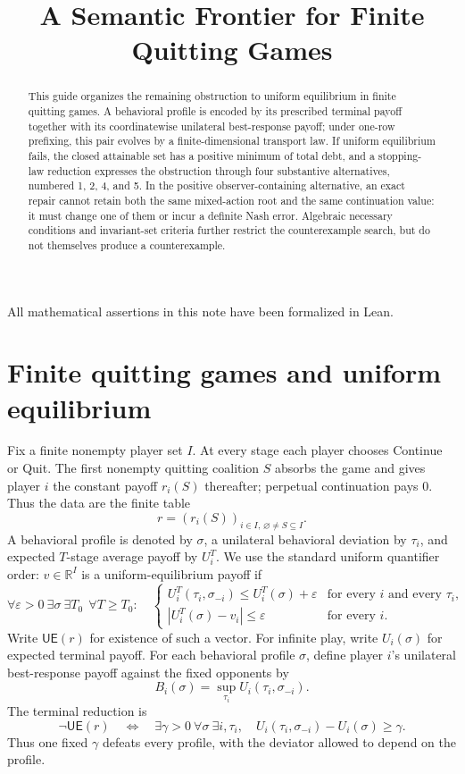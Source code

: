 \documentclass[11pt]{article}
\title{\vspace{-1.2cm}\textbf{A Semantic Frontier for Finite Quitting Games}}
\author{}
\date{}
\newcommand{\R}{\mathbb R}
\newcommand{\UE}{\mathsf{UE}}
\begin{document}
\maketitle

\begin{abstract}
This guide organizes the remaining obstruction to uniform equilibrium in
finite quitting games.  A behavioral profile is encoded by its prescribed
terminal payoff together with its coordinatewise unilateral best-response
payoff; under one-row prefixing, this pair evolves by a finite-dimensional
transport law.  If uniform equilibrium fails, the closed attainable set has
a positive minimum of total debt, and a stopping-law reduction expresses the
obstruction through four substantive alternatives, numbered 1, 2, 4, and 5.
In the positive observer-containing alternative, an exact repair cannot retain both the same mixed-action root
and the same continuation value: it must change one of them or incur a
definite Nash error.  Algebraic necessary conditions and invariant-set
criteria further restrict the counterexample search, but do not themselves
produce a counterexample.
\end{abstract}

All mathematical assertions in this note have been formalized in Lean.

\section{Finite quitting games and uniform equilibrium}
\label{sec:quitting-games}

Fix a finite nonempty player set $I$.  At every stage each player chooses
Continue or Quit.  The first nonempty quitting coalition $S$ absorbs the
game and gives player $i$ the constant payoff $r_i(S)$ thereafter; perpetual
continuation pays $0$.  Thus the data are the finite table
\[
 r=(r_i(S))_{i\in I,\,\varnothing\ne S\subseteq I}.
\]
A behavioral profile is denoted by $\sigma$, a unilateral behavioral
deviation by $\tau_i$, and expected $T$-stage average payoff by $U_i^T$.
We use the standard uniform quantifier order: $v\in\R^I$ is a
uniform-equilibrium payoff if
\[
 \forall\varepsilon>0\ \exists\sigma\ \exists T_0\
 \ \forall T\ge T_0:
 \quad
 \begin{cases}
 U_i^T(\tau_i,\sigma_{-i})\le U_i^T(\sigma)+\varepsilon
     &\text{for every }i\text{ and every }\tau_i,\\
 |U_i^T(\sigma)-v_i|\le\varepsilon&\text{for every }i.
 \end{cases}
\]
Write $\UE(r)$ for existence of such a vector.  For infinite play, write
$U_i(\sigma)$ for expected terminal payoff.  For each behavioral profile
$\sigma$, define player $i$'s unilateral best-response payoff against the fixed
opponents by
\[
 B_i(\sigma)=\sup_{\tau_i}U_i(\tau_i,\sigma_{-i}).
\]
The terminal reduction is
\begin{equation}
\label{eq:terminal-reduction}
 \neg\UE(r)
 \quad\Longleftrightarrow\quad
 \exists\gamma>0\ \forall\sigma\ \exists i,\tau_i,
 \quad U_i(\tau_i,\sigma_{-i})-U_i(\sigma)\ge\gamma.
\end{equation}
Thus one fixed $\gamma$ defeats every profile, with the deviator allowed to
depend on the profile.
\end{document}
